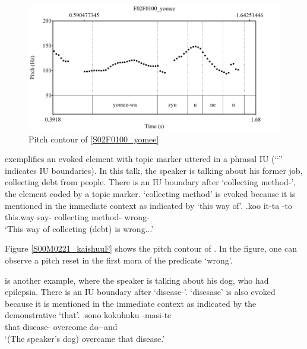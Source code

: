 \begin{figure}
	\begin{center}
	\includegraphics[width=.5\textwidth]{sounds/S02F0100_yomee.pdf}
	\caption{Pitch contour of \ref{S02F0100_yomee}}
	\label{S02F0100_yomeeF}
	\end{center}
\end{figure}

\Next exemplifies an evoked element with topic marker
uttered in a phrasal IU
(``\tp{\dvline}'' indicates IU boundaries).
In this talk, the speaker is talking about his former job,
collecting debt from people.
There is an IU boundary after  `collecting method-', the element coded by a topic marker.
 `collecting method' is evoked because
it is mentioned in the immediate context
as indicated by  `this way of'.
%
\exg.\label{S00M0221_kaishuu}koo it-ta \tp{\dvline}   \tp{\dvline} -to \tp{\dvline} \\
	this.way say- {} collecting method- {} wrong- {} \\
	`This way of collecting (debt) is wrong...'

Figure \ref{S00M0221_kaishuuF} shows the pitch contour of \Last.
In the figure,
one can observe a pitch reset in the first mora of the predicate  `wrong'.

\Next is another example,
where the speaker is talking about his dog,
who had epilepsia.
There is an IU boundary after  `disease-'.
 `disesase' is also evoked because it is mentioned in the immediate context
as indicated by the demonstrative  `that'.
%
\exg.\label{S02M0198_tenkan}sono  \tp{\dvline} {kokuhuku} -masi-te \tp{\dvline} \\
		that disease- {} overcome do--and {} \\
		`(The speaker's dog) overcame that disease.'

